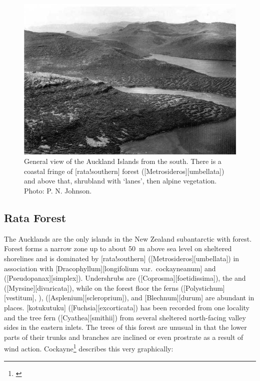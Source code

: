 \begin{figure}[!b]
	\includegraphics[width=\textwidth]{graphics/figure116auckland-islands.jpg}
	\centering
	\caption[General view of the Auckland Islands from the south]{General view of the Auckland Islands from the south.
	There is a coastal fringe of [rata!southern] forest ([Metrosideros][umbellata]) and above that, shrubland with `lanes', then alpine vegetation.
	Photo: P. N. Johnson.}%
	\label{fig:116auckland-islands}
\end{figure}

\subsection{Rata Forest}

The Aucklands are the only islands in the New Zealand subantarctic with forest.
Forest forms a narrow zone up to about \SI{50}{\metre} above sea level on sheltered shorelines and is dominated by [rata!southern] ([Metrosideros][umbellata]) in association with [Dracophyllum][longifolium var.\ cockayneanum] and  ([Pseudopanax][simplex]).
Undershrubs are  ([Coprosma][foetidissima]), the  and  ([Myrsine][divaricata]), while on the forest floor the ferns  ([Polystichum][vestitum], ),  ([Asplenium][scleroprium]), and [Blechnum][durum] are abundant in places.
[kotukutuku] ([Fuchsia][excorticata]) has been recorded from one locality and the tree fern  ([Cyathea][smithii]) from several sheltered north-facing valley sides in the eastern inlets.
The trees of this forest are unusual in that the lower parts of their trunks and branches are inclined or even prostrate as a result of wind action.
Cockayne\footnote{\cite{cockayne1909ecological}} describes this very graphically:

